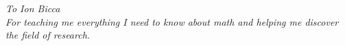 \documentclass[\main/thesis.tex]{subfiles}
\begin{document}
\begin{dedication}
	\vspace*{1in}
	\begin{center}
	         \emph{To Ion Bicca} \\
             \emph{For teaching me everything I need to know about math and helping me discover the field of research.}
	\end{center}
\end{dedication}
\end{document}
